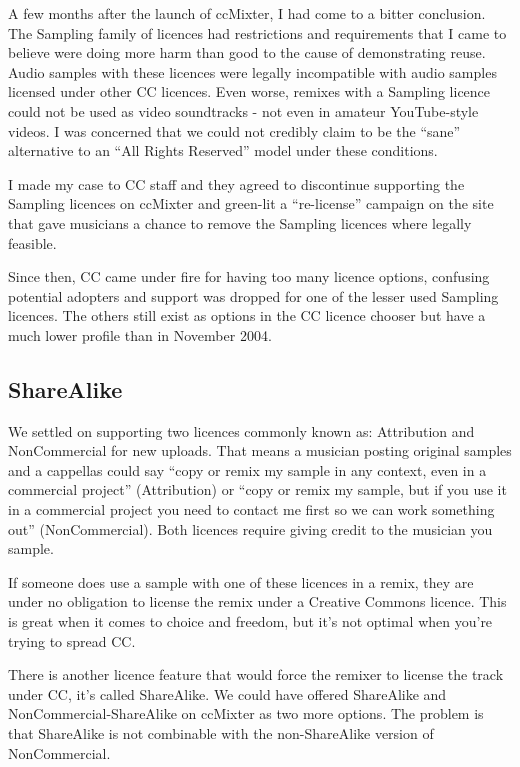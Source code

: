 A few months after the launch of ccMixter, I had come to a bitter conclusion.
The Sampling family of licences had restrictions and requirements that I came to
believe were doing more harm than good to the cause of demonstrating reuse.
Audio samples with these licences were legally incompatible with audio samples
licensed under other CC licences. Even worse, remixes with a Sampling licence
could not be used as video soundtracks - not even in amateur YouTube-style
videos. I was concerned that we could not credibly claim to be the ``sane''
alternative to an ``All Rights Reserved'' model under these conditions.

I made my case to CC staf\hbox{}f and they agreed to discontinue supporting the
Sampling licences on ccMixter and green-lit a ``re-license'' campaign on the
site that gave musicians a chance to remove the Sampling licences where legally
feasible.

Since then, CC came under f\hbox{}ire for having too many licence options, confusing
potential adopters and support was dropped for one of the lesser used Sampling
licences. The others still exist as options in the CC licence chooser but have a
much lower prof\hbox{}ile than in November 2004.


\subsection{ShareAlike}
\label{ss:unexpected_collaboration:license:sharealike}

We settled on supporting two licences commonly known as: Attribution and
NonCommercial for new uploads. That means a musician posting original samples
and a cappellas could say ``copy or remix my sample in any context, even in a
commercial project'' (Attribution) or ``copy or remix my sample, but if you use
it in a commercial project you need to contact me f\hbox{}irst so we can work something
out'' (NonCommercial). Both licences require giving credit to the musician you
sample.

If someone does use a sample with one of these licences in a remix, they are
under no obligation to license the remix under a Creative Commons licence. This
is great when it comes to choice and freedom, but it's not optimal when you're
trying to spread CC.

There is another licence feature that would force the remixer to license the
track under CC, it's called ShareAlike. We could have of\hbox{}fered ShareAlike and
NonCommercial-ShareAlike on ccMixter as two more options. The problem is that
ShareAlike is not combinable with the non-ShareAlike version of NonCommercial.

